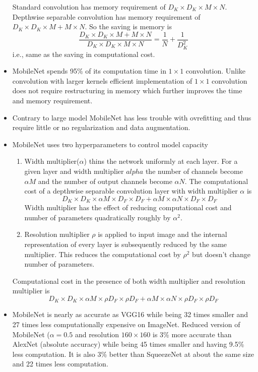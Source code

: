 \documentclass{article}
\begin{document}
\begin{itemize}
    Standard convolution has memory requirement of $D_K\times D_K \times M \times N$. Depthwise separable convolution has memory requirement of $D_K \times D_K \times M + M \times N$. So the saving is memory is 
    \begin{equation*}
        \dfrac{D_K \times D_K \times M + M \times N}{D_K\times D_K \times M \times N} = \dfrac{1}{N} + \dfrac{1}{D_K^2}
    \end{equation*}
    i.e., same as the saving in computational cost.
    \item MobileNet spends 95\% of its computation time in $1\times 1$ convolution. Unlike convolution with larger kernels efficient implementation of $1 \times 1$ convolution does not require restructuring in memory which further improves the time and memory requirement. 
    \item Contrary to large model MobileNet has less trouble with ovrefitting and thus require little or no regularization and data augmentation.
    \item MobileNet uses two hyperparameters to control model capacity
    \begin{enumerate}
        \item Width multiplier($\alpha$) thins the network uniformly at each layer. For a given layer and width multiplier $alpha$ the number of channels become $\alpha M$ and the number of output channels become $\alpha N$. The computational cost of a depthwise separable convolution layer with width multiplier $\alpha$ is 
        \begin{equation*}
            D_K \times D_K \times \alpha M \times D_F \times D_F + \alpha M \times \alpha N \times D_F \times D_F
        \end{equation*}
        Width multiplier has the effect of reducing computational cost and number of parameters quadratically roughly by $\alpha^2$.
        \item Resolution multiplier $\rho$ is applied to input image and the internal representation of every layer is subsequently reduced by the same multiplier. This reduces the computational cost by $\rho^2$ but doesn't change number of parameters. 
    \end{enumerate}
    Computational cost in the presence of both width multiplier and resolution multiplier is
    \begin{equation*}
        D_K \times D_K \times \alpha M \times \rho D_F \times \rho D_F + \alpha M \times \alpha N \times \rho D_F \times \rho D_F
    \end{equation*}
    \item MobileNet is nearly as accurate as VGG16 while being 32 times smaller and 27 times less computationally expensive on ImageNet. Reduced version of MobileNet ($\alpha=0.5$ and resolution $160\times 160$ is 3\% more accurate than AlexNet (absolute accuracy) while being 45 times smaller and having 9.5\% less computation. It is also 3\% better than SqueezeNet at about the same size and 22 times less computation.
\end{itemize}
\end{document}
